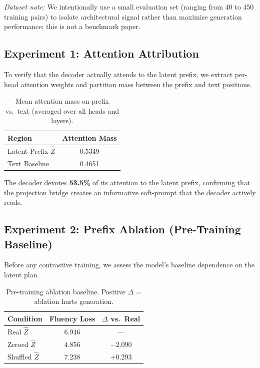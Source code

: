 \documentclass[11pt]{article}
\begin{document}
\textit{Dataset note:} We intentionally use a small evaluation set
(ranging from 40 to 450 training pairs) to isolate architectural signal
rather than maximise generation performance;  this is not a benchmark paper.

\subsection{Experiment 1: Attention Attribution}
\label{sec:exp1}

To verify that the decoder actually attends to the latent prefix, we extract
per-head attention weights and partition mass between the prefix and text
positions.

\begin{table}[h]
\centering
\caption{Mean attention mass on prefix vs.\ text (averaged over all heads and layers).}
\label{tab:exp1}
\begin{tabular}{lc}
\toprule
\textbf{Region} & \textbf{Attention Mass} \\
\midrule
Latent Prefix $\hat{Z}$ & 0.5349 \\
Text Baseline & 0.4651 \\
\bottomrule
\end{tabular}
\end{table}

The decoder devotes \textbf{53.5\%} of its attention to the latent prefix,
confirming that the projection bridge creates an informative soft-prompt that
the decoder actively reads.

\subsection{Experiment 2: Prefix Ablation (Pre-Training Baseline)}
\label{sec:exp2}

Before any contrastive training, we assess the model's baseline dependence on
the latent plan.

\begin{table}[h]
\centering
\caption{Pre-training ablation baseline. Positive $\Delta$ = ablation hurts generation.}
\label{tab:exp2}
\begin{tabular}{lcc}
\toprule
\textbf{Condition} & \textbf{Fluency Loss} & \textbf{$\Delta$ vs.\ Real} \\
\midrule
Real $\hat{Z}$ & 6.946 & — \\
Zeroed $\hat{Z}$ & 4.856 & $-2.090$ \\
Shuffled $\hat{Z}$ & 7.238 & $+0.293$ \\
\bottomrule
\end{tabular}
\end{table}
\end{document}
